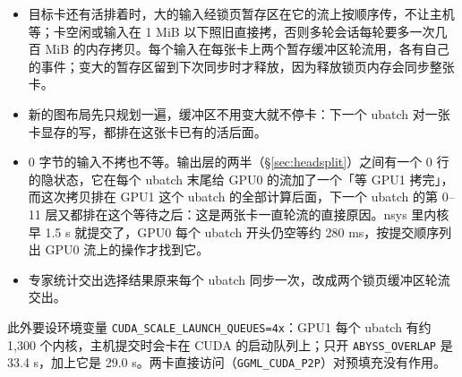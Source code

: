 \documentclass[11pt,a4paper]{article}
\newcommand{\code}[1]{\texttt{#1}}
\begin{document}
\begin{itemize}
  \item 目标卡还有活排着时，大的输入经锁页暂存区在它的流上按顺序传，不让主机等；卡空闲或输入在 1 MiB 以下照旧直接拷，否则多轮会话每轮要多一次几百 MiB 的内存拷贝。每个输入在每张卡上两个暂存缓冲区轮流用，各有自己的事件；变大的暂存区留到下次同步时才释放，因为释放锁页内存会同步整张卡。
  \item 新的图布局先只规划一遍，缓冲区不用变大就不停卡：下一个 ubatch 对一张卡显存的写，都排在这张卡已有的活后面。
  \item 0 字节的输入不拷也不等。输出层的两半（\S\ref{sec:headsplit}）之间有一个 0 行的隐状态，它在每个 ubatch 末尾给 GPU0 的流加了一个「等 GPU1 拷完」，而这次拷贝排在 GPU1 这个 ubatch 的全部计算后面，下一个 ubatch 的第 0--11 层又都排在这个等待之后：这是两张卡一直轮流的直接原因。nsys 里内核早 1.5 s 就提交了，GPU0 每个 ubatch 开头仍空等约 280 ms，按提交顺序列出 GPU0 流上的操作才找到它。
  \item 专家统计交出选择结果原来每个 ubatch 同步一次，改成两个锁页缓冲区轮流交出。
\end{itemize}

此外要设环境变量 \code{CUDA\_SCALE\_LAUNCH\_QUEUES=4x}：GPU1 每个 ubatch 有约 1,300 个内核，主机提交时会卡在 CUDA 的启动队列上；只开 \code{ABYSS\_OVERLAP} 是 33.4 s，加上它是 29.0 s。两卡直接访问（\code{GGML\_CUDA\_P2P}）对预填充没有作用。
\end{document}
